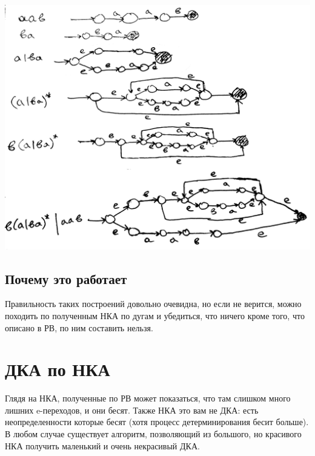 \documentclass[14pt]{extreport}
\begin{document}
	\includegraphics[scale=0.15]{data/pic1_2.png}\\
	\section*{Почему это работает}
	Правильность таких построений довольно очевидна, но если не верится, можно походить по
	полученным НКА по дугам и убедиться, что ничего кроме того, что описано в РВ, по ним
	составить нельзя.
	\newpage
	
	\chapter{ДКА по НКА}
	Глядя на НКА, полученные по РВ может показаться, что там слишком много лишних e-переходов,
	и они бесят. Также НКА это вам не ДКА: есть неопределенности которые бесят (хотя процесс
	детерминирования бесит больше). В любом случае существует алгоритм, позволяющий из большого,
	но красивого НКА получить маленький и очень некрасивый ДКА.
\end{document}
